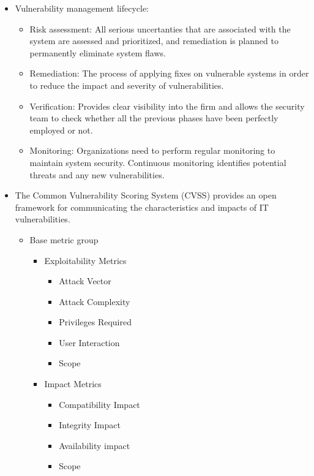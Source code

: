 \begin{itemize}
    \item Vulnerability management lifecycle:
    \begin{itemize}
        \item Risk assessment: All serious uncertanties that are associated with the system are assessed and prioritized, and remediation is planned to permanently eliminate system flaws.
        \item Remediation: The process of applying fixes on vulnerable systems in order to reduce the impact and severity of vulnerabilities.
        \item Verification: Provides clear visibility into the firm and allows the security team to check whether all the previous phases have been perfectly employed or not.
        \item Monitoring: Organizations need to perform regular monitoring to maintain system security. Continuous monitoring identifies potential threats and any new vulnerabilities.
    \end{itemize}
    \item The Common Vulnerability Scoring System (CVSS) provides an open framework for communicating the characteristics and impacts of IT vulnerabilities.
    \begin{itemize}
        \item Base metric group
        \begin{itemize}
            \item Exploitability Metrics
            \begin{itemize}
                \item Attack Vector
                \item Attack Complexity
                \item Privileges Required
                \item User Interaction
                \item Scope
            \end{itemize}
            \item Impact Metrics
            \begin{itemize}
                \item Compatibility Impact
                \item Integrity Impact
                \item Availability impact
                \item Scope
            \end{itemize}

\end{itemize}
\end{itemize}
\end{itemize}
